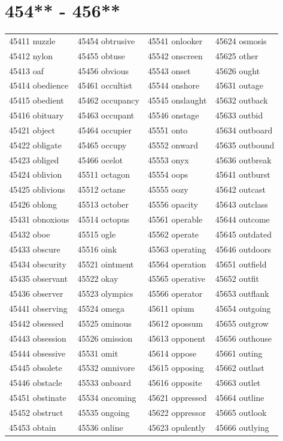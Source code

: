 \documentclass[10pt, oneside]{book}
\begin{document}
\begin{table}
	\centering
	\section*{454** - 456**}
	\begin{tabular}{l l l l}
45411 nuzzle &45454 obtrusive &45541 onlooker &45624 osmosis\\
45412 nylon &45455 obtuse &45542 onscreen &45625 other\\
45413 oaf &45456 obvious &45543 onset &45626 ought\\
45414 obedience &45461 occultist &45544 onshore &45631 outage\\
45415 obedient &45462 occupancy &45545 onslaught &45632 outback\\
45416 obituary &45463 occupant &45546 onstage &45633 outbid\\
45421 object &45464 occupier &45551 onto &45634 outboard\\
45422 obligate &45465 occupy &45552 onward &45635 outbound\\
45423 obliged &45466 ocelot &45553 onyx &45636 outbreak\\
45424 oblivion &45511 octagon &45554 oops &45641 outburst\\
45425 oblivious &45512 octane &45555 oozy &45642 outcast\\
45426 oblong &45513 october &45556 opacity &45643 outclass\\
45431 obnoxious &45514 octopus &45561 operable &45644 outcome\\
45432 oboe &45515 ogle &45562 operate &45645 outdated\\
45433 obscure &45516 oink &45563 operating &45646 outdoors\\
45434 obscurity &45521 ointment &45564 operation &45651 outfield\\
45435 observant &45522 okay &45565 operative &45652 outfit\\
45436 observer &45523 olympics &45566 operator &45653 outflank\\
45441 observing &45524 omega &45611 opium &45654 outgoing\\
45442 obsessed &45525 ominous &45612 opossum &45655 outgrow\\
45443 obsession &45526 omission &45613 opponent &45656 outhouse\\
45444 obsessive &45531 omit &45614 oppose &45661 outing\\
45445 obsolete &45532 omnivore &45615 opposing &45662 outlast\\
45446 obstacle &45533 onboard &45616 opposite &45663 outlet\\
45451 obstinate &45534 oncoming &45621 oppressed &45664 outline\\
45452 obstruct &45535 ongoing &45622 oppressor &45665 outlook\\
45453 obtain &45536 online &45623 opulently &45666 outlying\\
	\end{tabular}
 \end{table}
\clearpage
\end{document}
